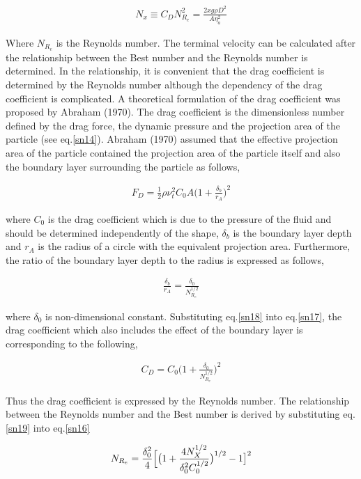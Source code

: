 \begin{eqnarray}
N_{x}\equiv C_{D}N_{R_{e}}^{2}=\frac{2xg\rho D^{2}}{A\eta_{a}^{2}}
\label{sn16}
\end{eqnarray}

Where $N_{R_{e}}$ is the Reynolds number. The terminal velocity can be calculated after the relationship between the Best number and the Reynolds number is determined. In the relationship, it is convenient that the drag coefficient is determined by the Reynolds number although the dependency of the drag coefficient is complicated. A theoretical formulation of the drag coefficient was proposed by Abraham (1970). The drag coefficient is the dimensionless number defined by the drag force, the dynamic pressure and the projection area of the particle (see eq.\ref{sn14}). Abraham (1970) assumed that the effective projection area of the particle contained the projection area of the particle itself and also the boundary layer surrounding the particle as follows,


\begin{eqnarray}
F_{D}=\frac{1}{2}\rho \nu_{t}^{2}C_{0}A\bigl(1+\frac{\delta_{b}}{r_{A}}\bigl)^{2}
\label{sn17}
\end{eqnarray}

where $C_{0}$ is the drag coefficient which is due to the pressure of the fluid and should be determined independently of the shape, $\delta_{b}$ is the boundary layer depth and $r_{A}$ is the radius of a circle with the equivalent projection area. Furthermore, the ratio of the boundary layer depth to the radius is expressed as follows,

\begin{eqnarray}
\frac{\delta_{b}}{r_{A}}=\frac{\delta_{0}}{N_{R_{e}}^{1/2}}
\label{sn18}
\end{eqnarray}

where $\delta_{0}$ is non-dimensional constant. Substituting eq.\ref{sn18} into eq.\ref{sn17}, the drag coefficient which also includes the effect of the boundary layer is corresponding to the following,

\begin{eqnarray}
C_{D}=C_{0}\bigl(1+\frac{\delta_{0}}{N_{R_{e}}^{1/2}}\bigr)^{2}
\label{sn19}
\end{eqnarray}

Thus the drag coefficient is expressed by the Reynolds number. The relationship between the Reynolds number and the Best number is derived by substituting eq.\ref{sn19} into eq.\ref{sn16}

\begin{eqnarray}
N_{R_{e}}=\frac{\delta_{0}^{2}}{4}\Bigl[\bigr(1+\frac{4N_{X}^{1/2}}{\delta_{0}^{2}C_{0}^{1/2}}\bigr)^{1/2}-1 \bigr]^{2}
\label{sn20}
\end{eqnarray}

